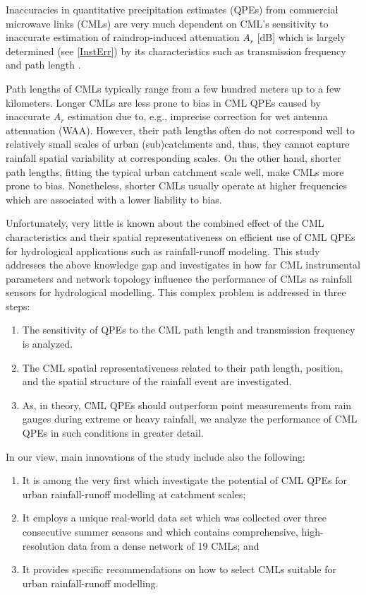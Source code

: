 \documentclass{ctuthesis}\usepackage[]{graphicx}\usepackage[]{color}
\begin{document}
Inaccuracies in quantitative precipitation estimates (QPEs) from commercial microwave links (CMLs) are very much dependent on CML's sensitivity to inaccurate estimation of raindrop-induced attenuation $A_r$ [dB] which is largely determined (see \ref{InstErr}) by its characteristics such as transmission frequency and path length \citep{leijnseMicrowaveLinkRainfall2008}.
       
Path lengths of CMLs typically range from a few hundred meters up to a few kilometers. Longer CMLs are less prone to bias in CML QPEs caused by inaccurate $A_r$ estimation due to, e.g., imprecise correction for wet antenna attenuation (WAA). However, their path lengths often do not correspond well to relatively small scales of urban (sub)catchments and, thus, they cannot capture rainfall spatial variability at corresponding scales. On the other hand, shorter path lengths, fitting the typical urban catchment scale well, make CMLs more prone to bias. Nonetheless, shorter CMLs usually operate at higher frequencies which are associated with a lower liability to bias. 

Unfortunately, very little is known about the combined effect of the CML characteristics and their spatial representativeness on efficient use of CML QPEs for hydrological applications such as rainfall-runoff modeling. This study addresses the above knowledge gap and investigates in how far CML instrumental parameters and network topology influence the performance of CMLs as rainfall sensors for hydrological modelling. This complex problem is addressed in three steps: 
        \begin{enumerate}
        \itemsep0em 
                \item{The sensitivity of QPEs to the CML path length and transmission frequency is  analyzed.}
                \item{The CML spatial representativeness related to their path length, position, and the spatial structure of the rainfall event are investigated.}
                \item{As, in theory, CML QPEs should outperform point measurements from rain gauges during extreme or heavy rainfall, we analyze the performance of CML QPEs in such conditions in greater detail.}
        \end{enumerate}

In our view, main innovations of the study include also the following:
        \begin{enumerate}
        \itemsep0em 
                \item{It is among the very first which investigate the potential of CML QPEs for urban rainfall-runoff modelling at catchment scales;}
                \item{It employs a unique real-world data set which was collected over three consecutive summer seasons and which contains comprehensive, high-resolution data from a dense network of 19 CMLs; and}
                \item{It provides specific recommendations on how to select CMLs suitable for urban rainfall-runoff modelling.}
        \end{enumerate}
        
\end{document}
